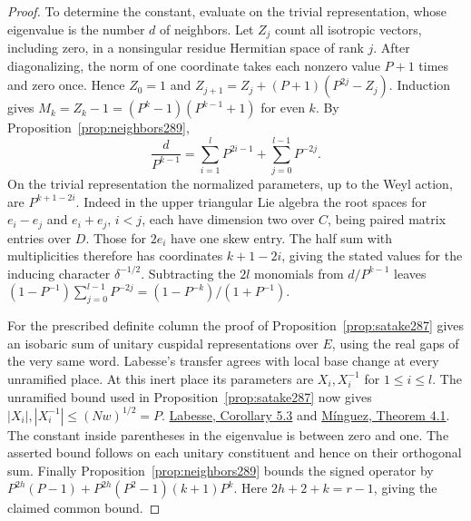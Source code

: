 \documentclass[a4paper,11pt]{article}
\theoremstyle{definition}
\theoremstyle{remark}
\numberwithin{equation}{section}
\begin{document}
\begin{proof}
To determine the constant, evaluate on the trivial
representation, whose eigenvalue is the number \(d\) of
neighbors. Let \(Z_j\) count all isotropic vectors, including
zero, in a nonsingular residue Hermitian space of rank \(j\).
After diagonalizing, the norm of one coordinate takes each
nonzero value \(P+1\) times and zero once. Hence \(Z_0=1\)
and \(Z_{j+1}=Z_j+(P+1)(P^{2j}-Z_j)\). Induction gives
\(M_k=Z_k-1=(P^k-1)(P^{k-1}+1)\) for even \(k\).
By Proposition~\ref{prop:neighbors289},
\[
      \frac d{P^{k-1}}=\sum_{i=1}^l P^{2i-1}
                             +\sum_{j=0}^{l-1}P^{-2j}.
\]
On the trivial representation the normalized parameters,
up to the Weyl action, are \(P^{k+1-2i}\). Indeed in the
upper triangular Lie algebra the root spaces for \(e_i-e_j\)
and \(e_i+e_j\), \(i<j\), each have dimension two over
\(C\), being paired matrix entries over \(D\). Those for
\(2e_i\) have one skew entry. The half sum with multiplicities
therefore has coordinates \(k+1-2i\), giving the stated
values for the inducing character \(\delta^{-1/2}\).
Subtracting the \(2l\) monomials from \(d/P^{k-1}\) leaves
\((1-P^{-1})\sum_{j=0}^{l-1}P^{-2j}
=(1-P^{-k})/(1+P^{-1})\).

For the prescribed definite column the proof of
Proposition~\ref{prop:satake287} gives an isobaric sum of
unitary cuspidal representations over \(E\), using the real
gaps of the very same word. Labesse's transfer agrees with
local base change at every unramified place. At this inert
place its parameters are \(X_i,X_i^{-1}\) for \(1\le i\le l\).
The unramified bound used in Proposition~\ref{prop:satake287}
now gives \(|X_i|,|X_i^{-1}|\le(Nw)^{1/2}=P\).
\href{https://webusers.imj-prg.fr/~michael.harris/CBCM.pdf}
{Labesse, Corollary 5.3} and
\href{https://www.imj-prg.fr/fa/bpFiles/Minguez.pdf}
{M\'inguez, Theorem 4.1}.
The constant inside parentheses in the eigenvalue is between
zero and one. The asserted bound follows on each unitary
constituent and hence on their orthogonal sum. Finally
Proposition~\ref{prop:neighbors289} bounds the signed operator
by \(P^{2h}(P-1)+P^{2h}(P^2-1)(k+1)P^k\).
Here \(2h+2+k=r-1\), giving the claimed common bound.
\end{proof}
\end{document}
